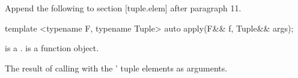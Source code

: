 \documentclass[ebook,11pt,article]{memoir}
\begin{document}
Append the following to section [tuple.elem] after paragraph 11.

\begin{itemdecl}
template <typename F, typename Tuple>
auto apply(F&& f, Tuple&& args);
\end{itemdecl}
\begin{itemdescr}
\pnum
\requires {} is a .  is a function object.

\returns The result of calling  with the ' tuple elements as arguments.
\end{itemdescr}




\section{}


\end{document}
